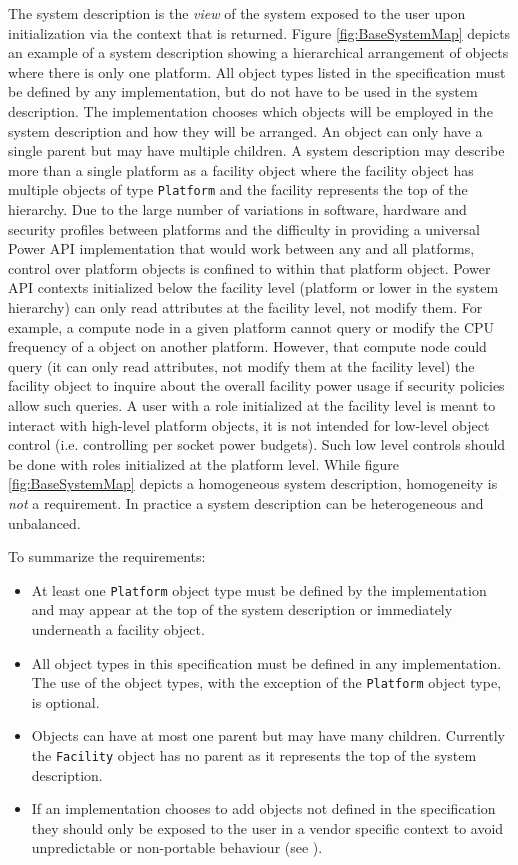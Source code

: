 The system description is the \textit{view} of the system exposed to the user upon initialization via the context that is returned.
Figure \ref{fig:BaseSystemMap} depicts an example of a system description showing a hierarchical arrangement of objects where there is only one platform.
All object types listed in the specification must be defined by any implementation, but do not have to be used in the system description.
The implementation chooses which objects will be employed in the system description and how they will be arranged.
An object can only have a single parent but may have multiple children.
A system description may describe more than a single platform as a facility object where the facility object has multiple objects of type \texttt{Platform} and the facility represents the top of the hierarchy. 
Due to the large number of variations in software, hardware and security profiles between platforms and the difficulty in providing a universal Power API implementation that would work between any and all platforms, control over platform objects is confined to within that platform object. 
Power API contexts initialized below the facility level (platform or lower in the system hierarchy) can only read attributes at the facility level, not modify them.
For example, a compute node in a given platform cannot query or modify the CPU frequency of a object on another platform. 
However, that compute node could query (it can only read attributes, not modify them at the facility level) the facility object to inquire about the overall facility power usage if security policies allow such queries. 
A user with a role initialized at the facility level is meant to interact with high-level platform objects, it is not intended for low-level object control (i.e. controlling per socket power budgets). Such low level controls should be done with roles initialized at the platform level.
While figure \ref{fig:BaseSystemMap} depicts a homogeneous system description, homogeneity is \textit{not} a requirement. 
In practice a system description can be heterogeneous and unbalanced.

To summarize the requirements:
\begin{itemize}[noitemsep,nolistsep] %
	\item{
	At least one \texttt{Platform} object type must be defined by the implementation and may appear at the top of the system description or immediately underneath a facility object.
	}
	\item{
	All object types in this specification must be defined in any implementation. The use of the object types, with the exception of the \texttt{Platform} object type, is optional.
	}
	\item{
	Objects can have at most one parent but may have many children. Currently the \texttt{Facility} object has no parent as it represents the top of the system description.
	}
        \item{
        If an implementation chooses to add objects not defined in the specification they should only be exposed to the user in a vendor specific context to avoid unpredictable or non-portable behaviour (see ).
        }
\end{itemize}

